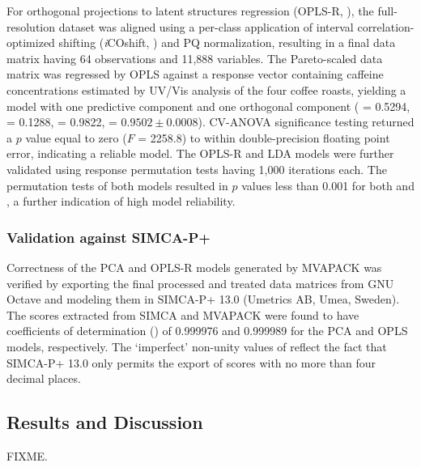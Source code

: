 \begin{doublespace}
For orthogonal projections to latent structures regression
(OPLS-R, \cite{trygg:jchemo2002}), the full-resolution dataset was aligned
using a per-class application of interval correlation-optimized shifting
(\emph{i}COshift, \cite{savorani:jmr2010}) and PQ normalization, resulting
in a final data matrix having 64 observations and 11,888 variables. The
Pareto-scaled data matrix was regressed by OPLS against a response vector
containing caffeine concentrations estimated by UV/Vis analysis of the four
coffee roasts, yielding a model with one predictive component and one
orthogonal component (\rsqxp{} = 0.5294, \rsqxo{} = 0.1288, \rsqy{} = 0.9822,
\qsq{} = $0.9502 \pm 0.0008$). CV-ANOVA significance testing returned a $p$
value equal to zero ($F$ = 2258.8) to within double-precision floating point
error, indicating a reliable model. The OPLS-R and LDA models were further
validated using response permutation tests having 1,000 iterations each. The
permutation tests of both models resulted in $p$ values less than 0.001 for
both \rsqy{} and \qsq{}, a further indication of high model reliability.
\end{doublespace}

\subsubsection{Validation against SIMCA-P+}

\begin{doublespace}
Correctness of the PCA and OPLS-R models generated by MVAPACK was verified by
exporting the final processed and treated data matrices from GNU Octave and
modeling them in SIMCA-P+ 13.0 (Umetrics AB, Umea, Sweden). The scores
extracted from SIMCA and MVAPACK were found to have coefficients of
determination (\rsq{}) of 0.999976 and 0.999989 for the PCA and OPLS models,
respectively. The `imperfect' non-unity values of \rsq{} reflect the fact that
SIMCA-P+ 13.0 only permits the export of scores with no more than four decimal
places.
\end{doublespace}

\subsection{Results and Discussion}

\begin{doublespace}
FIXME.
\end{doublespace}

